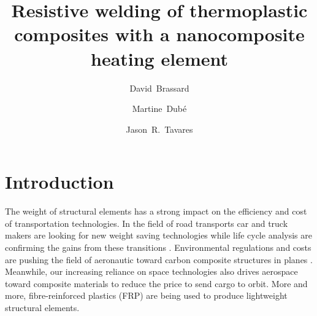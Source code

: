 \documentclass[11pt,review,times]{elsarticle}
\begin{document}


\title{Resistive welding of thermoplastic composites with a nanocomposite heating element}

\author[polymtl,crepec]{David~Brassard}
\author[ets,crepec]{Martine~Dubé}
\author[polymtl,crepec]{Jason~R.~Tavares}


\address[polymtl]{Department of Chemical Engineering, Polytechnique Montréal, P.O. Box 6079 Station Centre-Ville, Montréal, QC, H3C 3A7, Canada}
\address[ets]{Department of Mechanical Engineering, École de technologie supérieure, 1100 Notre-Dame Street West, Montréal, Québec, Canada, H3C 1K3}
\address[crepec]{Research Center for High Performance Polymer and Composite Systems (CREPEC), Polytechnique Montréal, P.O. Box 6079 Station Centre-Ville, Montréal, QC, H3C 3A7, Canada}

\begin{abstract}
\end{abstract}

\begin{keyword}

\end{keyword}

\maketitle


							\section{Introduction}

The weight of structural elements has a strong impact on the efficiency and cost of transportation technologies. 
In the field of road transports car and truck makers are looking for new weight saving technologies \cite{FordMotorLLC2018} while life cycle analysis are confirming the gains from these transitions \cite{Cecchel2018,Meng2017}. 
Environmental regulations and costs are pushing the field of aeronautic toward carbon composite structures in planes \cite{Williams2003,Timmis2015}. 
Meanwhile, our increasing reliance on space technologies also drives aerospace toward composite materials to reduce the price to send cargo to orbit. 
More and more, fibre-reinforced plastics (FRP) are being used to produce lightweight structural elements. 
\end{document}
